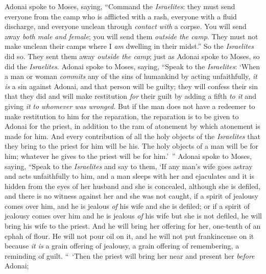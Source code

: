 \begin{biblechapter} %
 Adonai spoke to Moses, saying,
\verse “Command the \textit{Israelites}: they must send everyone from the camp who is afflicted with a rash, everyone with a fluid discharge, and everyone unclean through \textit{contact with} a corpse.
\verse You will send away \textit{both male and female}; you will send them \textit{outside the camp}. They must not make unclean their camps where I \textit{am} dwelling in their midst.”
\verse So the \textit{Israelites} did so. They sent them away \textit{outside the camp}; just as Adonai spoke to Moses, so did the \textit{Israelites}.
 Adonai spoke to Moses, saying,
\verse “Speak to the \textit{Israelites}: ‘When a man or woman \textit{commits} any of the sins of humankind by acting unfaithfully, \textit{it is} a sin against Adonai, and that person will be guilty;
\verse they will confess their sin that they did and will make restitution \textit{for} their guilt by adding a fifth \textit{to it} and giving \textit{it} \textit{to whomever was wronged}.
\verse But if the man does not have a redeemer to make restitution to him for the reparation, the reparation is to be given to Adonai for the priest, in addition to the ram of atonement by which atonement is made for him.
\verse And every contribution of all the holy objects of the \textit{Israelites} that they bring to the priest for him will be his.
\verse The holy objects of a man will be for him; whatever he gives to the priest will be for him.’ ”
 Adonai spoke to Moses, saying,
\verse “Speak to the \textit{Israelites} and say to them, ‘If any man’s wife goes astray and acts unfaithfully to him,
\verse and a man sleeps with her and ejaculates and it is hidden from the eyes of her husband and she is concealed, although she is defiled, and there is no witness against her and she was not caught,
\verse if a spirit of jealousy comes over him, and he is jealous \textit{of} his wife and she is defiled; or if a spirit of jealousy comes over him and he is jealous \textit{of} his wife but she is not defiled,
\verse he will bring his wife to the priest. And he will bring her offering for her, one-tenth of an ephah of flour. He will not pour oil on it, and he will not put frankincense on it because \textit{it is} a grain offering of jealousy, a grain offering of remembering, a reminding of guilt.
\verse “ ‘Then the priest will bring her near and present her \textit{before} Adonai;

\end{biblechapter}
